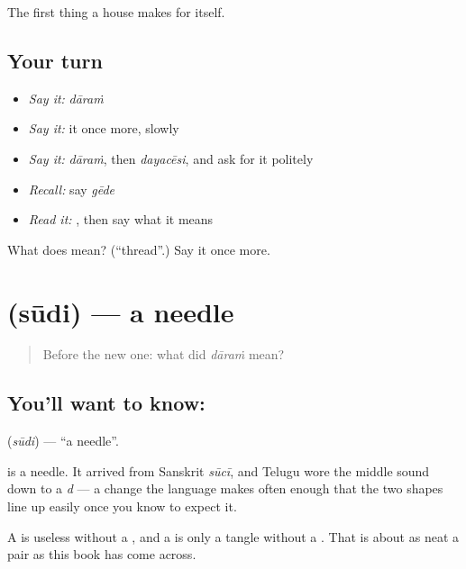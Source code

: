 \begin{grammarlens}[title={What you've built}]
The first thing a house makes for itself.
\end{grammarlens}

\subsection*{Your turn}
\begin{itemize}
\raggedright
  \item \emph{Say it:} \emph{dāraṁ}
  \item \emph{Say it:} it once more, slowly
  \item \emph{Say it:} \emph{dāraṁ}, then \emph{dayacēsi}, and ask for it politely
  \item \emph{Recall:} say \emph{gēde}
  \item \emph{Read it:} \textbf{}, then say what it means
\end{itemize}

\begin{tcolorbox}[breakable,colback=teal!4,colframe=teal!35!black,title={Before you move on}]
What does  mean? (\textquotedblleft{}thread\textquotedblright{}.) Say it once more.
\end{tcolorbox}
\section[\texorpdfstring{\te{సూది} (sūdi)}{సూది (sūdi)}]{ (sūdi) — a needle}

\label{lesson:TE-C62-needle}



\begin{quote}
Before the new one: what did \emph{dāraṁ} mean?
\end{quote}

\subsection*{You'll want to know: }
\textbf{} (\emph{sūdi}) — \textquotedblleft{}a needle\textquotedblright{}.

 is a needle. It arrived from Sanskrit \emph{sūcī}, and Telugu wore the middle sound down to a \emph{d} — a change the language makes often enough that the two shapes line up easily once you know to expect it.

A  is useless without a , and a  is only a tangle without a . That is about as neat a pair as this book has come across.

